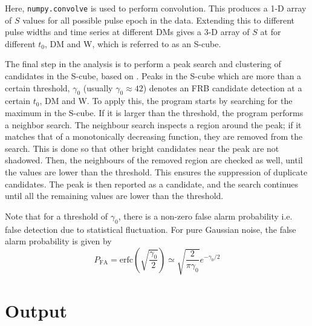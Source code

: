 Here, \texttt{numpy.convolve} is used to perform convolution. This produces a 1-D array of $S$ values for all possible pulse epoch in the data. Extending this to different pulse widths and time series at different DMs gives a 3-D array of $S$ at for different $t_0$, DM and W, which is referred to as an S-cube. 


The final step in the analysis is to perform a peak search and clustering of candidates in the S-cube, based on . Peaks in the S-cube which are more than a certain threshold, $\gamma_0$ (usually $\gamma_0 \approx 42$) denotes an FRB candidate detection at a certain $t_0$, DM and W. To apply this, the program starts by searching for the maximum in the S-cube. If it is larger than the threshold, the program performs a neighbor search. The neighbour search inspects a region around the peak; if it matches that of a monotonically decreasing function, they are removed from the search. This is done so that other bright candidates near the peak are not shadowed. Then, the neighbours of the removed region are checked as well, until the values are lower than the threshold. This ensures the suppression of duplicate candidates. The peak is then reported as a candidate, and the search continues until all the remaining values are lower than the threshold. 

Note that for a threshold of $\gamma_0$, there is a non-zero false alarm probability i.e. false detection due to statistical fluctuation. For pure Gaussian noise, the false alarm probability is given by \cite{Men2019}
\begin{equation}
    P_{\text{FA}} = \text{erfc}\left(\sqrt{\frac{\gamma_0}{2}}\right) \simeq \sqrt{\frac{2}{\pi\gamma_0}} e^{-\gamma_0/2}
\end{equation}

\section{Output}

